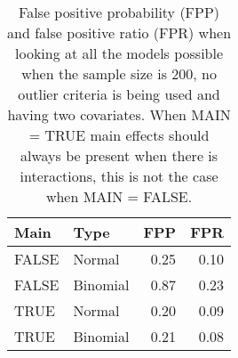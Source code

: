 \begin{longtable}{llrr}
\caption{False positive probability (FPP) and false positive ratio (FPR) when looking at all the models possible when the sample size is 200, no outlier criteria is being used and having two covariates. When MAIN = TRUE main effects should always be present when there is interactions, this is not the case when MAIN = FALSE. } \\ 
  \hline
Main & Type & FPP & FPR \\ 
  \hline
FALSE & Normal & 0.25 & 0.10 \\ 
  FALSE & Binomial & 0.87 & 0.23 \\ 
  TRUE & Normal & 0.20 & 0.09 \\ 
  TRUE & Binomial & 0.21 & 0.08 \\ 
   \hline
\hline
\end{longtable}
